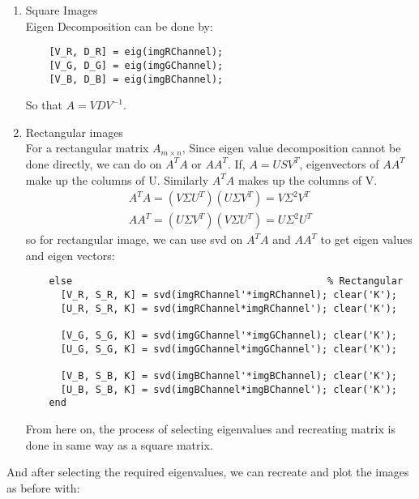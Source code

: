 \documentclass{article}
\begin{document}
\begin{enumerate}
  \item Square Images\\
  Eigen Decomposition can be done by:\\
  \begin{lstlisting}
    [V_R, D_R] = eig(imgRChannel);
    [V_G, D_G] = eig(imgGChannel);
    [V_B, D_B] = eig(imgBChannel);
  \end{lstlisting}
  So that $A = VDV^{-1}$.\\
  \item Rectangular images\\
  For a rectangular matrix $A_{m \times n}$, Since eigen value decomposition cannot be done directly, we can do on $A^T A$ or $AA^T$. If, $A = USV^T$,  eigenvectors of $AA^T$  make up the columns of U. Similarly $A^TA$ makes up the columns of V. 
  \begin{align}
    A^T A = (V\Sigma U^T)(U\Sigma V^T) = V\Sigma ^2 V^T\\
    AA^T = (U\Sigma V^T)(V\Sigma U^T) = U\Sigma ^2 U^T
  \end{align}
  so for rectangular image, we can use svd on $A^TA$ and $AA^T$ to get eigen values and eigen vectors:
  \begin{lstlisting}
    else                                            % Rectangular
      [V_R, S_R, K] = svd(imgRChannel'*imgRChannel); clear('K');
      [U_R, S_R, K] = svd(imgRChannel*imgRChannel'); clear('K');

      [V_G, S_G, K] = svd(imgGChannel'*imgGChannel); clear('K');
      [U_G, S_G, K] = svd(imgGChannel*imgGChannel'); clear('K');

      [V_B, S_B, K] = svd(imgBChannel'*imgBChannel); clear('K');
      [U_B, S_B, K] = svd(imgBChannel*imgBChannel'); clear('K');
    end
  \end{lstlisting}
  From here on, the process of selecting eigenvalues and recreating matrix is done in same way as a square matrix.\\
  \end{enumerate}
  And after selecting the required eigenvalues, we can recreate and plot the images as before with:\\
\end{document}
